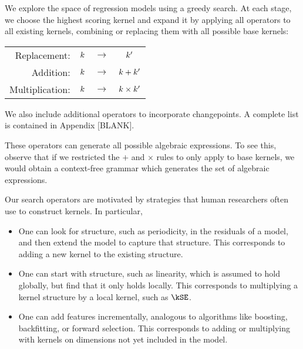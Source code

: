 We explore the space of regression models using a greedy search.
At each stage, we choose the highest scoring kernel and expand it by applying all operators to all existing kernels, combining or replacing them with all possible base kernels:
%
\begin{center}
\begin{tabular}{rccc}
\textnormal{Replacement:}    & $k$ & $\to$ & $k'$\\
\textnormal{Addition:}       & $k$ & $\to$ & $k + k'$\\
\textnormal{Multiplication:} & $k$ &  $\to$ & $k \times k'$\\
\end{tabular}
\end{center}
%
We also include additional operators to incorporate changepoints.
A complete list is contained in Appendix [BLANK]. 

These operators can generate all possible algebraic expressions.
To see this, observe that if we restricted the $+$ and $\times$ rules to only apply to base kernels, we would obtain a context-free grammar which generates the set of algebraic expressions.

Our search operators are motivated by strategies that human researchers often use to construct kernels.
In particular,
\begin{itemize}
\item One can look for structure, such as periodicity, in the residuals of a model, and then extend the model to capture that structure.
This corresponds to adding a new kernel to the existing structure.
\item One can start with structure, such as linearity, which is assumed to hold globally, but find that it only holds locally.
This corresponds to multiplying a kernel structure by a local kernel, such as $\kSE$.
\item One can add features incrementally, analogous to algorithms like boosting, backfitting, or forward selection.
This corresponds to adding or multiplying with kernels on dimensions not yet included in the model.
\end{itemize}


